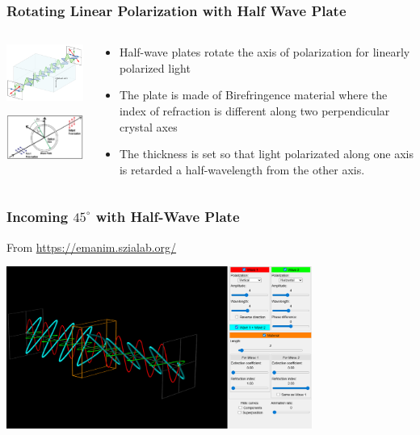 \documentclass{beamer}
\begin{document}
\begin{frame}\frametitle{Rotating Linear Polarization with Half Wave Plate}
\begin{columns}
\begin{column}{5cm}
\begin{center}
\includegraphics[width=5cm]{fig/HWP.png}

\includegraphics[width=5cm]{fig/thorHWP.jpg}
\end{center}

\end{column}
\begin{column}{6cm}
\begin{itemize}
\item Half-wave plates rotate the axis of polarization for linearly polarized light
\item The plate is made of Birefringence material where the index of refraction is different along two perpendicular crystal axes
\item The thickness is set so that light polarizated along one axis is retarded a half-wavelength from the other axis. 
\end{itemize}

\end{column}
\end{columns}
\end{frame}



\begin{frame}\frametitle{Incoming $45^\circ$ with Half-Wave Plate}
From \url{https://emanim.szialab.org/}

\begin{center}
\includegraphics[width=10cm]{fig/waveplate_45_2.png}
\end{center}
\end{frame}
\end{document}
